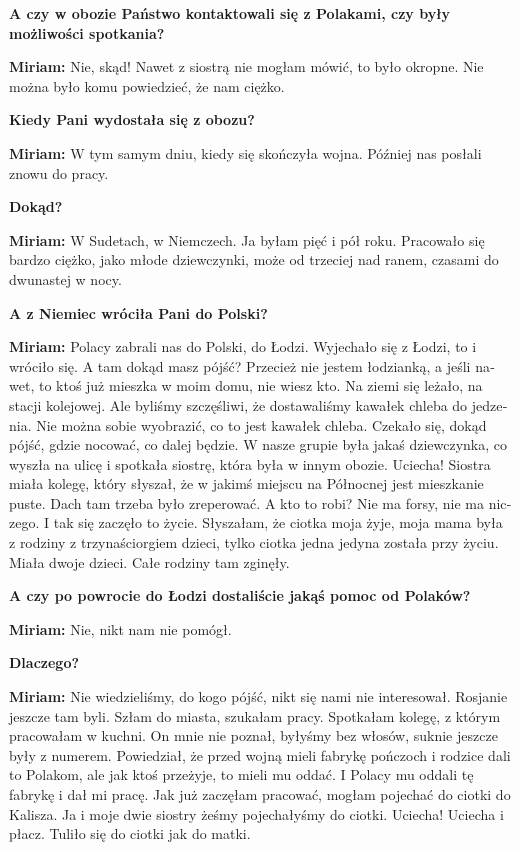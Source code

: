 \begin{otherlanguage}{ngerman}
\textbf{A czy w obozie Państwo kontaktowali się z Polakami, czy były możliwości spotkania?}

\textbf{Miriam:} Nie, skąd! Nawet z siostrą nie mogłam mówić, to było okropne. Nie można było komu powiedzieć, że nam ciężko. 

\textbf{Kiedy Pani wydostała się z obozu?} 

\textbf{Miriam:} W tym samym dniu, kiedy się skończyła wojna. Później nas posłali znowu do pracy.  

\textbf{Dokąd?} 

\textbf{Miriam:} W Sudetach, w Niemczech. Ja byłam pięć i pół roku. Pracowało się bardzo ciężko, jako młode dziewczynki, może od trzeciej nad ranem, czasami do dwunastej w nocy. 

\textbf{A z Niemiec wróciła Pani do Polski?} 

\textbf{Miriam:} Polacy zabrali nas do Polski, do Łodzi. Wyjechało się z Łodzi, to i wróciło się. A tam dokąd masz pójść? Przecież nie jestem łodzianką, a jeśli nawet, to ktoś już mieszka w moim domu, nie wiesz kto. Na ziemi się leżało, na stacji kolejowej. Ale byliśmy szczęśliwi, że dostawaliśmy kawałek chleba do jedzenia. Nie można sobie wyobrazić, co to jest kawałek chleba. Czekało się, dokąd pójść, gdzie nocować, co dalej będzie. W nasze grupie była jakaś dziewczynka, co wyszła na ulicę i spotkała siostrę, która była w innym obozie. Uciecha! Siostra miała kolegę, który słyszał, że w jakimś miejscu na Północnej jest mieszkanie puste. Dach tam trzeba było zreperować. A kto to robi? Nie ma forsy, nie ma niczego. I tak się zaczęło to życie. Słyszałam, że ciotka moja żyje, moja mama była z rodziny z trzynaściorgiem dzieci, tylko ciotka jedna jedyna została przy życiu. Miała dwoje dzieci. Całe rodziny tam zginęły.

\textbf{A czy po powrocie do Łodzi dostaliście jakąś pomoc od Polaków? } 

\textbf{Miriam:}  Nie, nikt nam nie pomógł. 

\textbf{Dlaczego?} 

\textbf{Miriam:} Nie wiedzieliśmy, do kogo pójść, nikt się nami nie interesował. Rosjanie jeszcze tam byli. Szłam do miasta, szukałam pracy. Spotkałam kolegę, z którym pracowałam w kuchni. On mnie nie poznał, byłyśmy bez włosów, suknie jeszcze były z numerem. Powiedział, że przed wojną mieli fabrykę pończoch i rodzice dali to Polakom, ale jak ktoś przeżyje, to mieli mu oddać. I Polacy mu oddali tę fabrykę i dał mi pracę. Jak już zaczęłam pracować, mogłam pojechać do ciotki do Kalisza. Ja i moje dwie siostry żeśmy pojechałyśmy do ciotki. Uciecha! Uciecha i płacz. Tuliło się do ciotki jak do matki. 


\end{otherlanguage}
